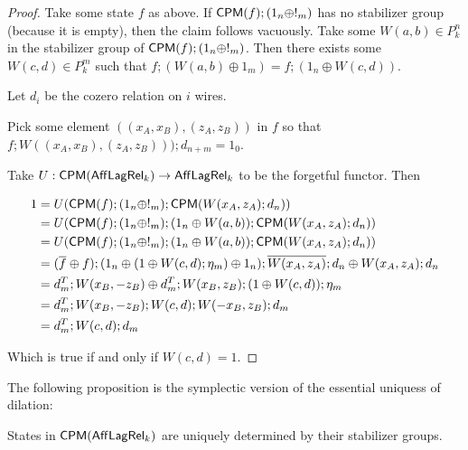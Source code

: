 \begin{proof}
Take some state $f$ as above.  If $\mathsf{CPM}(f);(1_n \oplus !_m)$ has no stabilizer group (because it is empty), then the claim follows vacuously. 
Take some  $W(a,b) \in P_k^n$ in the stabilizer group of $\mathsf{CPM}(f);(1_n \oplus !_m)$.
Then there exists some $W(c,d) \in P_k^m$ such that $f;(W(a,b)\oplus 1_m) = f;(1_n \oplus W(c,d))$.


Let $d_i$ be the cozero relation on $i$ wires.

Pick some element $((x_A,x_B),(z_A,z_B))$ in $f$ so that $f;W((x_A,x_B),(z_A,z_B)));d_{n+m}=1_0$.


Take $U:\mathsf{CPM}(\mathsf{Aff}\mathsf{Lag}\mathsf{Rel}_k) \to \mathsf{Aff}\mathsf{Lag}\mathsf{Rel}_k$ to be the forgetful functor.  Then

\begin{align*}
1 &=U( \mathsf{CPM}(f);(1_n \oplus !_m); \mathsf{CPM}(W(x_A,z_A);d_{n}) )\\
   &=U( \mathsf{CPM}(f);(1_n \oplus !_m); (1_n\oplus W(a,b)) ; \mathsf{CPM}(W(x_A,z_A);d_{n}) )\\
   &=U( \mathsf{CPM}(f);(1_n \oplus !_m); (1_n\oplus W(a,b)) ; \mathsf{CPM}(W(x_A,z_A);d_{n}) )\\
   &=  (\overline{f}\hspace*{.01cm} \oplus f);(1_n \oplus (1\oplus W(c,d )  ;\eta_m) \oplus 1_n ); \overline{W(x_A,z_A)}\hspace*{.01cm};d_{n} \oplus W(x_A,z_A);d_{n}\\
   &=  d_m^T;W(x_B,-z_B)\oplus d_m^T;W(x_B,z_B)   ; (1\oplus W(c,d) )  ;\eta_m\\
   &= d_m^T;W(x_B,-z_B);W(c,d);W(-x_B,z_B);d_m\\
   &= d_m^T;W(c,d);d_m\\
\end{align*}

Which is true if and only if $W(c,d)=1$.

\end{proof}


The following proposition is the symplectic version of the essential uniquess of dilation:
\begin{proposition}
States in $\mathsf{CPM}(\mathsf{Aff}\mathsf{Lag}\mathsf{Rel}_k)$ are uniquely determined by their stabilizer groups.
\end{proposition}


